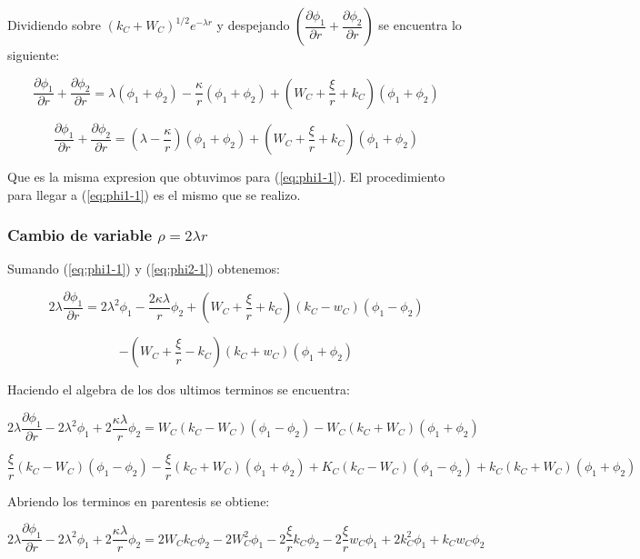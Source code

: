 \documentclass[a4paper, 12pt]{article} %
\begin{document}
Dividiendo sobre $(k_C + W_C)^{1/2}e^{-\lambda r}$ y despejando $\left( \dfrac{\partial \phi_1}{\partial r} 
+ \dfrac{\partial \phi_2}{\partial r} \right)$ se encuentra lo siguiente:

\[
\dfrac{\partial \phi_1}{\partial r} + \dfrac{\partial \phi_2}{\partial r} = \lambda (\phi_1 + \phi_2) - \dfrac{\kappa}{r}(\phi_1 + \phi_2)
+\left( W_C + \dfrac{\xi}{r} + k_C  \right)(\phi_1 + \phi_2) 
\]

\begin{equation}
\dfrac{\partial \phi_1}{\partial r} + \dfrac{\partial \phi_2}{\partial r} = \left ( \lambda - \dfrac{\kappa}{r} \right ) (\phi_1 + \phi_2)
+\left( W_C + \dfrac{\xi}{r} + k_C  \right)(\phi_1 + \phi_2) 
\end{equation}

Que es la misma expresion que obtuvimos para (\ref{eq:phi1-1}). El procedimiento para llegar a (\ref{eq:phi1-1}) es el mismo que se realizo.

 
\subsubsection{Cambio de variable $\rho=2\lambda r$} 

Sumando  (\ref{eq:phi1-1}) y  (\ref{eq:phi2-1}) obtenemos:

\[
2 \lambda \dfrac{\partial \phi_1}{\partial r} = 2 \lambda^2  \phi_1 
- \dfrac{2 \kappa \lambda }{r}\phi_2 + \left( W_C + \dfrac{\xi}{r} + k_C  \right ) 
(k_C - w_C)(\phi_1 - \phi_2) 
\]

\[
- \left( W_C + \dfrac{\xi}{r} - k_C  \right )(k_C + w_C)(\phi_1 + \phi_2) 
\]

Haciendo el algebra de los dos ultimos terminos se encuentra:

\[
2 \lambda \dfrac{\partial \phi_1}{\partial r} -  2 \lambda^2  \phi_1 + 2\dfrac{\kappa \lambda}{r}\phi_2
= W_C(k_C - W_C)(\phi_1 - \phi_2) - W_C(k_C + W_C)(\phi_1 + \phi_2)
\]

\[
\dfrac{\xi}{r}(k_C - W_C)(\phi_1 - \phi_2) - \dfrac{\xi}{r}(k_C + W_C)(\phi_1 + \phi_2)
+ K_C (k_C - W_C)(\phi_1 - \phi_2) + k_C (k_C + W_C)(\phi_1 + \phi_2)
\]

Abriendo los terminos en parentesis se obtiene:

\[
2 \lambda \dfrac{\partial \phi_1}{\partial r} -  2 \lambda^2  \phi_1 + 2\dfrac{\kappa \lambda}{r}\phi_2
= 2W_Ck_C\phi_2 - 2W_C^2 \phi_1 - 2 \dfrac{\xi}{r}k_C \phi_2 - 2 \dfrac{\xi}{r}w_C \phi_1 
+ 2 k_C^2 \phi_1  + k_C w_C \phi_2
\]
\end{document}
